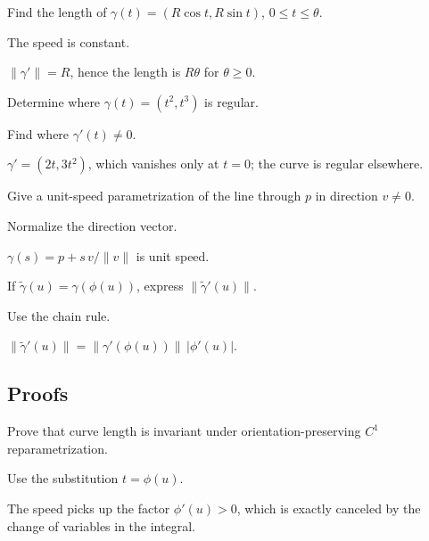 \begin{exercise}\label{exr:vii12-ped-02}
Find the length of \(\gamma(t)=(R\cos t,R\sin t)\), \(0\le t\le\theta\).
\end{exercise}
\begin{hint}
The speed is constant.
\end{hint}
\begin{solution}
\(\|\gamma'\|=R\), hence the length is \(R\theta\) for \(\theta\ge0\).
\end{solution}

\begin{exercise}\label{exr:vii12-ped-03}
Determine where \(\gamma(t)=(t^2,t^3)\) is regular.
\end{exercise}
\begin{hint}
Find where \(\gamma'(t)\neq0\).
\end{hint}
\begin{solution}
\(\gamma'=(2t,3t^2)\), which vanishes only at \(t=0\); the curve is regular elsewhere.
\end{solution}

\begin{exercise}\label{exr:vii12-ped-04}
Give a unit-speed parametrization of the line through \(p\) in direction \(v\neq0\).
\end{exercise}
\begin{hint}
Normalize the direction vector.
\end{hint}
\begin{solution}
\(\gamma(s)=p+s\,v/\|v\|\) is unit speed.
\end{solution}

\begin{exercise}\label{exr:vii12-ped-05}
If \(\tilde\gamma(u)=\gamma(\phi(u))\), express \(\|\tilde\gamma'(u)\|\).
\end{exercise}
\begin{hint}
Use the chain rule.
\end{hint}
\begin{solution}
\(\|\tilde\gamma'(u)\|=\|\gamma'(\phi(u))\|\,|\phi'(u)|\).
\end{solution}

\subsection*{Proofs}

\begin{exercise}\label{exr:vii12-ped-06}
Prove that curve length is invariant under orientation-preserving \(C^1\) reparametrization.
\end{exercise}
\begin{hint}
Use the substitution \(t=\phi(u)\).
\end{hint}
\begin{solution}
The speed picks up the factor \(\phi'(u)>0\), which is exactly canceled by the change of variables in the integral.
\end{solution}

